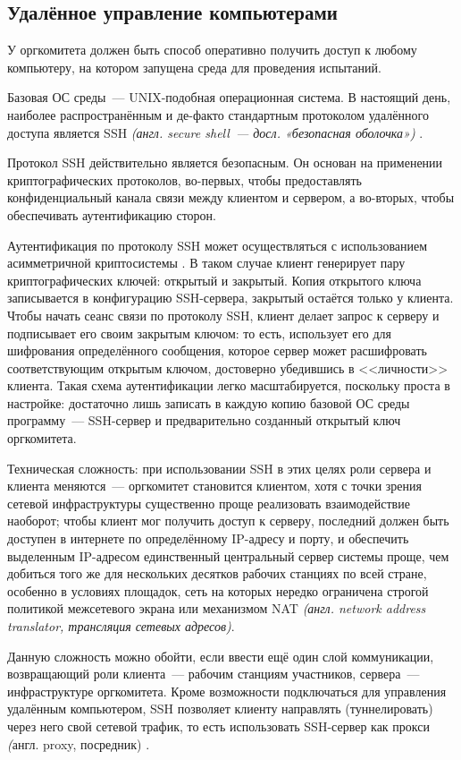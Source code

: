 \subsection{Удалённое управление компьютерами}
\label{cha:ana:ssh}

У оргкомитета должен быть способ оперативно получить доступ к любому компьютеру, на котором запущена среда для проведения испытаний.

Базовая ОС среды~--- UNIX-подобная операционная система. В настоящий день, наиболее распространённым и де-факто стандартным протоколом удалённого доступа является SSH \textit{(англ. secure shell~--- досл. «безопасная оболочка»)} \cite{SSH}.

Протокол SSH действительно является безопасным. Он основан на применении криптографических протоколов, во-первых, чтобы предоставлять конфиденциальный канала связи между клиентом и сервером, а во-вторых, чтобы обеспечивать аутентификацию сторон.

Аутентификация по протоколу SSH может осуществляться с использованием асимметричной криптосистемы \cite{SSHAuth}. В таком случае клиент генерирует пару криптографических ключей: открытый и закрытый. Копия открытого ключа записывается в конфигурацию SSH-сервера, закрытый остаётся только у клиента. Чтобы начать сеанс связи по протоколу SSH, клиент делает запрос к серверу и подписывает его своим закрытым ключом: то есть, использует его для шифрования определённого сообщения, которое сервер может расшифровать соответствующим открытым ключом, достоверно убедившись в <<личности>> клиента. Такая схема аутентификации легко масштабируется, поскольку проста в настройке: достаточно лишь записать в каждую копию базовой ОС среды программу~--- SSH-сервер и предварительно созданный открытый ключ оргкомитета.

Техническая сложность: при использовании SSH в этих целях роли сервера и клиента меняются~--- оргкомитет становится клиентом, хотя с точки зрения сетевой инфраструктуры существенно проще реализовать взаимодействие наоборот; чтобы клиент мог получить доступ к серверу, последний должен быть доступен в интернете по определённому IP-адресу и порту, и обеспечить выделенным IP-адресом единственный центральный сервер системы проще, чем добиться того же для нескольких десятков рабочих станциях по всей стране, особенно в условиях площадок, сеть на которых нередко ограничена строгой политикой межсетевого экрана или механизмом NAT \textit{(англ. network address translator, трансляция сетевых адресов)}.

Данную сложность можно обойти, если ввести ещё один слой коммуникации, возвращающий роли клиента~--- рабочим станциям участников, сервера~--- инфраструктуре оргкомитета. Кроме возможности подключаться для управления удалённым компьютером, SSH позволяет клиенту направлять (туннелировать) через него свой сетевой трафик, то есть использовать SSH-сервер как прокси \textit(англ. proxy, посредник) \cite{SSH}.

